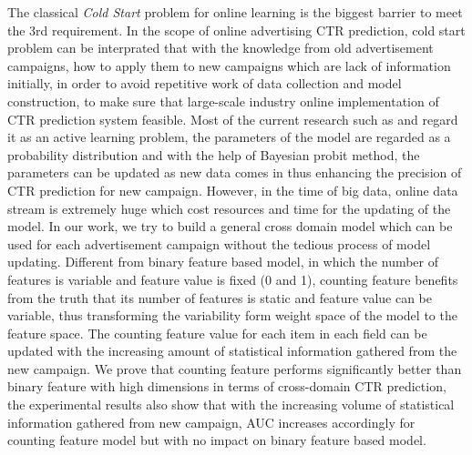The classical \textit{Cold Start} problem for online learning is the biggest barrier to meet the 3rd requirement. In the scope of online advertising CTR prediction, cold start problem can be interprated that with the knowledge from old advertisement campaigns, how to apply them to new campaigns which are lack of information initially, in order to avoid repetitive work of data collection and model construction, to make sure that large-scale industry online implementation of CTR prediction system feasible. Most of the current research such as \cite{mohan2011web} \cite{chu2011unbiased} \cite{he2014practical} and \cite{mcmahan2013ad} regard it as an active learning problem, the parameters of the model are regarded as a probability distribution and with the help of Bayesian probit method, the parameters can be updated as new data comes in thus enhancing the precision of CTR prediction for new campaign. However, in the time of big data, online data stream is extremely huge which cost resources and time for the updating of the model. In our work, we try to build a general cross domain model which can be used for each advertisement campaign without the tedious process of model updating. Different from binary feature based model, in which the number of features is variable and feature value is fixed (0 and 1), counting feature benefits from the truth that its number of features is static and feature value can be variable, thus transforming the variability form weight space of the model to the feature space. The counting feature value for each item in each field can be updated with the increasing amount of statistical information gathered from the new campaign. We prove that counting feature performs significantly better than binary feature with high dimensions in terms of cross-domain CTR prediction, the experimental results also show that with the increasing volume of statistical information gathered from new campaign, AUC increases accordingly for counting feature model but with no impact on binary feature based model.

